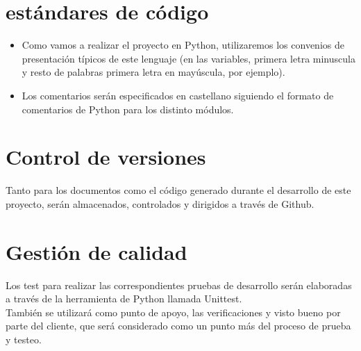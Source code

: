 \documentclass[a4paper,12pt,oneside]{article}
\begin{document}
\section{estándares de código}

\begin{itemize}
	\item Como vamos a realizar el proyecto en Python, utilizaremos los convenios de presentación típicos de este lenguaje (en las variables, primera letra minuscula y resto de palabras primera letra en mayúscula, por ejemplo).
	\item Los comentarios serán especificados en castellano siguiendo el formato de comentarios de Python para los distinto módulos.
\end{itemize}


\section{Control de versiones}

Tanto para los documentos como el código generado durante el desarrollo de este proyecto, serán almacenados, controlados y dirigidos a través de Github.

\section{Gestión de calidad}

Los test para realizar las correspondientes pruebas de desarrollo serán elaboradas a través de la herramienta de Python llamada Unittest.\\

También se utilizará como punto de apoyo, las verificaciones y visto bueno por parte del cliente, que será considerado como un punto más del proceso de prueba y testeo.










\end{document}
